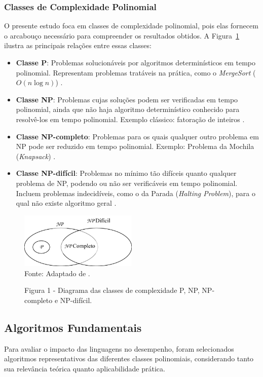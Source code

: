 \documentclass[12pt,a4paper]{article}
\newcommand{\eng}[1]{\textit{#1}}
\begin{document}
\subsubsection{Classes de Complexidade Polinomial}
O presente estudo foca em classes de complexidade polinomial, pois elas fornecem o arcabouço necessário para compreender os resultados obtidos. A Figura~\ref{fig:complexidade} ilustra as principais relações entre essas classes:

\begin{itemize}
  \item \textbf{Classe P}: Problemas solucionáveis por algoritmos determinísticos em tempo polinomial. Representam problemas tratáveis na prática, como o \eng{MergeSort} (\(O(n \log n)\)) .
  \item \textbf{Classe NP}: Problemas cujas soluções podem ser verificadas em tempo polinomial, ainda que não haja algoritmo determinístico conhecido para resolvê-los em tempo polinomial. Exemplo clássico: fatoração de inteiros .
  \item \textbf{Classe NP-completo}: Problemas para os quais qualquer outro problema em NP pode ser reduzido em tempo polinomial. Exemplo: Problema da Mochila (\eng{Knapsack}) .
  \item \textbf{Classe NP-difícil}: Problemas no mínimo tão difíceis quanto qualquer problema de NP, podendo ou não ser verificáveis em tempo polinomial. Incluem problemas indecidíveis, como o da Parada (\eng{Halting Problem}), para o qual não existe algoritmo geral .
\end{itemize}

\begin{figure}[H]
  \caption{Figura 1 - Diagrama das classes de complexidade P, NP, NP-completo e NP-difícil.}
  \centering
  \includegraphics[width=0.5\textwidth]{img/relacaoDeConjuntos.png}
  \label{fig:complexidade}
  \\ \small Fonte: Adaptado de .
\end{figure}

\subsection{Algoritmos Fundamentais}
Para avaliar o impacto das linguagens no desempenho, foram selecionados algoritmos representativos das diferentes classes polinomiais, considerando tanto sua relevância teórica quanto aplicabilidade prática.
\end{document}
